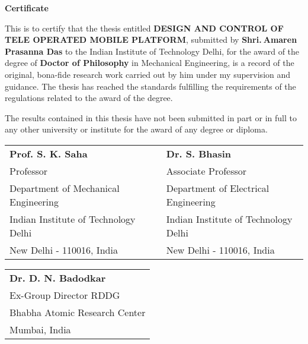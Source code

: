 \doublespacing
\newpage
\thispagestyle{empty}
\mbox{}
\newpage
\thispagestyle{empty}
\begin{center}
\textbf{\Large{Certificate}}
\end{center}

This is to certify that the thesis entitled \textbf{DESIGN AND CONTROL OF TELE OPERATED MOBILE PLATFORM}, submitted by   \textbf{Shri.$~$Amaren Prasanna Das} to the Indian Institute of Technology Delhi, for the award of the degree of \textbf{Doctor of Philosophy} in Mechanical Engineering, is a record of the original, bona-fide research work carried out by him under my supervision and guidance. The thesis has reached the standards fulfilling the requirements of the regulations related to the award of the degree.

The results contained in this thesis have not been submitted in part or in full to any other university or institute for the award of any degree or diploma.
\bigskip
\bigskip
\bigskip
\bigskip
\bigskip

\begin{tabular}{l l l}
\textbf{Prof. S. K. Saha} &  & \textbf{Dr. S. Bhasin}\\
Professor & &Associate Professor\\
Department of Mechanical Engineering &  & Department of Electrical Engineering\\
Indian Institute of Technology Delhi &  & Indian Institute of Technology Delhi\\
New Delhi - 110016, India & \quad \quad \quad & New Delhi - 110016, India
\end{tabular}
\bigskip
\bigskip
\bigskip
\bigskip
\bigskip

\begin{tabular}{l}
\textbf{Dr. D. N. Badodkar}\\
Ex-Group Director RDDG\\
Bhabha Atomic Research Center\\
Mumbai, India\\
\end{tabular}












\restoregeometry